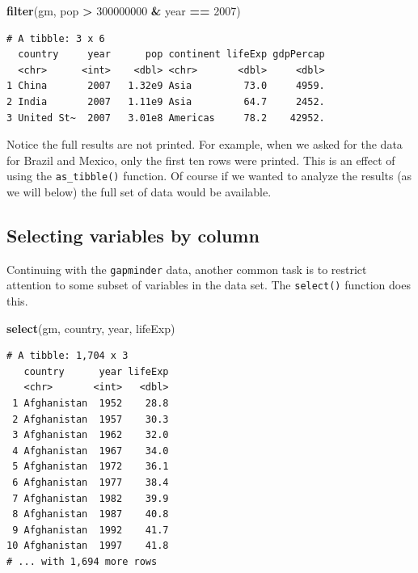 \documentclass[
]{krantz}
\makeatletter
\newenvironment{Shaded}{\begin{snugshade}}{\end{snugshade}}
\newcommand{\DecValTok}[1]{\textcolor[rgb]{0.06,0.06,0.06}{#1}}
\newcommand{\KeywordTok}[1]{\textcolor[rgb]{0.27,0.27,0.27}{\textbf{#1}}}
\newcommand{\NormalTok}[1]{#1}
\newcommand{\OperatorTok}[1]{\textcolor[rgb]{0.43,0.43,0.43}{\textbf{#1}}}
\newcommand{\StringTok}[1]{\textcolor[rgb]{0.5,0.5,0.5}{#1}}
\newenvironment{kframe}{%
\medskip{}
\setlength{\fboxsep}{.8em}
 \def\at@end@of@kframe{}%
 \ifinner\ifhmode%
  \def\at@end@of@kframe{\end{minipage}}%
  \begin{minipage}{\columnwidth}%
 \fi\fi%
 \def\FrameCommand##1{\hskip\@totalleftmargin \hskip-\fboxsep
 \colorbox{shadecolor}{##1}\hskip-\fboxsep
     \hskip-\linewidth \hskip-\@totalleftmargin \hskip\columnwidth}%
 \MakeFramed {\advance\hsize-\width
   \@totalleftmargin\z@ \linewidth\hsize
   \@setminipage}}%
 {\par\unskip\endMakeFramed%
 \at@end@of@kframe}
\renewenvironment{Shaded}{\begin{kframe}}{\end{kframe}}
\makeatother
\begin{document}
\begin{Shaded}
\begin{Highlighting}[]
\KeywordTok{filter}\NormalTok{(gm, pop }\OperatorTok{\textgreater{}}\StringTok{ }\DecValTok{300000000} \OperatorTok{\&}\StringTok{ }\NormalTok{year }\OperatorTok{==}\StringTok{ }\DecValTok{2007}\NormalTok{)}
\end{Highlighting}
\end{Shaded}

\begin{verbatim}
# A tibble: 3 x 6
  country     year      pop continent lifeExp gdpPercap
  <chr>      <int>    <dbl> <chr>       <dbl>     <dbl>
1 China       2007   1.32e9 Asia         73.0     4959.
2 India       2007   1.11e9 Asia         64.7     2452.
3 United St~  2007   3.01e8 Americas     78.2    42952.
\end{verbatim}

Notice the full results are not printed. For example, when we asked for the data for Brazil and Mexico, only the first ten rows were printed. This is an effect of using the \texttt{as\_tibble()} function. Of course if we wanted to analyze the results (as we will below) the full set of data would be available.

\hypertarget{selecting-variables-by-column}{%
\subsection{Selecting variables by column}\label{selecting-variables-by-column}}

Continuing with the \texttt{gapminder} data, another common task is to restrict attention to some subset of variables in the data set. The \texttt{select()} function does this.

\begin{Shaded}
\begin{Highlighting}[]
\KeywordTok{select}\NormalTok{(gm, country, year, lifeExp)}
\end{Highlighting}
\end{Shaded}

\begin{verbatim}
# A tibble: 1,704 x 3
   country      year lifeExp
   <chr>       <int>   <dbl>
 1 Afghanistan  1952    28.8
 2 Afghanistan  1957    30.3
 3 Afghanistan  1962    32.0
 4 Afghanistan  1967    34.0
 5 Afghanistan  1972    36.1
 6 Afghanistan  1977    38.4
 7 Afghanistan  1982    39.9
 8 Afghanistan  1987    40.8
 9 Afghanistan  1992    41.7
10 Afghanistan  1997    41.8
# ... with 1,694 more rows
\end{verbatim}
\end{document}
